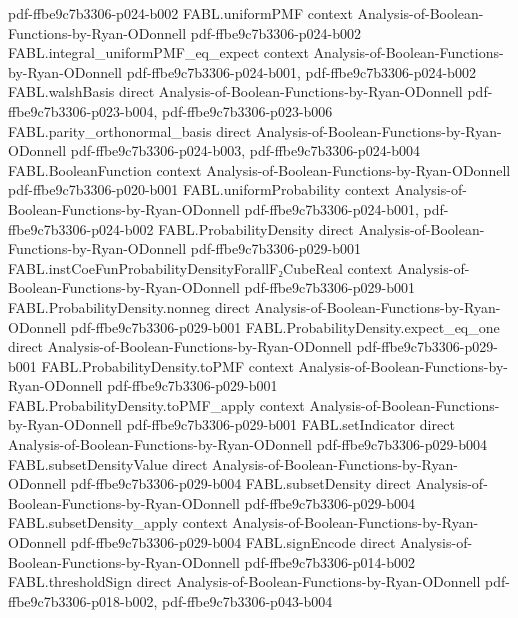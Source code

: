 \begin{theorem}
{    pdf-ffbe9c7b3306-p024-b002}
\proofstep
  {FABL.uniformPMF}
  {context}
  {Analysis-of-Boolean-Functions-by-Ryan-ODonnell}
  {pdf-ffbe9c7b3306-p024-b002}
\proofstep
  {FABL.integral_uniformPMF_eq_expect}
  {context}
  {Analysis-of-Boolean-Functions-by-Ryan-ODonnell}
  {pdf-ffbe9c7b3306-p024-b001,
    pdf-ffbe9c7b3306-p024-b002}
\proofstep
  {FABL.walshBasis}
  {direct}
  {Analysis-of-Boolean-Functions-by-Ryan-ODonnell}
  {pdf-ffbe9c7b3306-p023-b004,
    pdf-ffbe9c7b3306-p023-b006}
\proofstep
  {FABL.parity_orthonormal_basis}
  {direct}
  {Analysis-of-Boolean-Functions-by-Ryan-ODonnell}
  {pdf-ffbe9c7b3306-p024-b003,
    pdf-ffbe9c7b3306-p024-b004}
\proofstep
  {FABL.BooleanFunction}
  {context}
  {Analysis-of-Boolean-Functions-by-Ryan-ODonnell}
  {pdf-ffbe9c7b3306-p020-b001}
\proofstep
  {FABL.uniformProbability}
  {context}
  {Analysis-of-Boolean-Functions-by-Ryan-ODonnell}
  {pdf-ffbe9c7b3306-p024-b001,
    pdf-ffbe9c7b3306-p024-b002}
\proofstep
  {FABL.ProbabilityDensity}
  {direct}
  {Analysis-of-Boolean-Functions-by-Ryan-ODonnell}
  {pdf-ffbe9c7b3306-p029-b001}
\proofstep
  {FABL.instCoeFunProbabilityDensityForallF₂CubeReal}
  {context}
  {Analysis-of-Boolean-Functions-by-Ryan-ODonnell}
  {pdf-ffbe9c7b3306-p029-b001}
\proofstep
  {FABL.ProbabilityDensity.nonneg}
  {direct}
  {Analysis-of-Boolean-Functions-by-Ryan-ODonnell}
  {pdf-ffbe9c7b3306-p029-b001}
\proofstep
  {FABL.ProbabilityDensity.expect_eq_one}
  {direct}
  {Analysis-of-Boolean-Functions-by-Ryan-ODonnell}
  {pdf-ffbe9c7b3306-p029-b001}
\proofstep
  {FABL.ProbabilityDensity.toPMF}
  {context}
  {Analysis-of-Boolean-Functions-by-Ryan-ODonnell}
  {pdf-ffbe9c7b3306-p029-b001}
\proofstep
  {FABL.ProbabilityDensity.toPMF_apply}
  {context}
  {Analysis-of-Boolean-Functions-by-Ryan-ODonnell}
  {pdf-ffbe9c7b3306-p029-b001}
\proofstep
  {FABL.setIndicator}
  {direct}
  {Analysis-of-Boolean-Functions-by-Ryan-ODonnell}
  {pdf-ffbe9c7b3306-p029-b004}
\proofstep
  {FABL.subsetDensityValue}
  {direct}
  {Analysis-of-Boolean-Functions-by-Ryan-ODonnell}
  {pdf-ffbe9c7b3306-p029-b004}
\proofstep
  {FABL.subsetDensity}
  {direct}
  {Analysis-of-Boolean-Functions-by-Ryan-ODonnell}
  {pdf-ffbe9c7b3306-p029-b004}
\proofstep
  {FABL.subsetDensity_apply}
  {context}
  {Analysis-of-Boolean-Functions-by-Ryan-ODonnell}
  {pdf-ffbe9c7b3306-p029-b004}
\proofstep
  {FABL.signEncode}
  {direct}
  {Analysis-of-Boolean-Functions-by-Ryan-ODonnell}
  {pdf-ffbe9c7b3306-p014-b002}
\proofstep
  {FABL.thresholdSign}
  {direct}
  {Analysis-of-Boolean-Functions-by-Ryan-ODonnell}
  {pdf-ffbe9c7b3306-p018-b002,
    pdf-ffbe9c7b3306-p043-b004}

\end{theorem}
